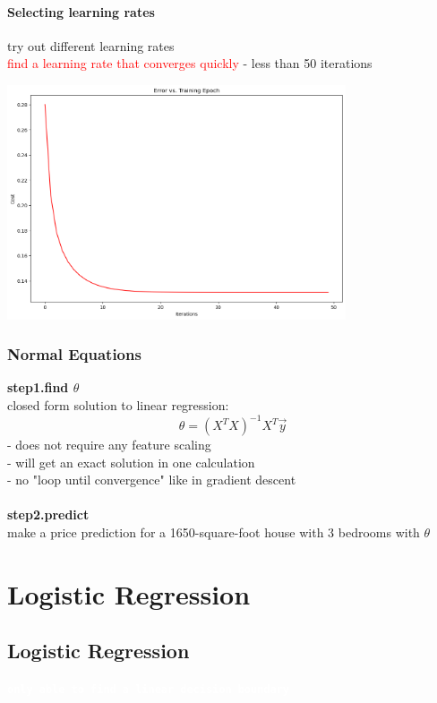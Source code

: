 \documentclass[a4paper, 12pt]{book}
\begin{document}
			\subsubsection{Selecting learning rates}
	try out different learning rates \\
	\textcolor{red}{find a learning rate that converges quickly} - less than 50 iterations
	\begin{center}
	\includegraphics[width=10cm]{epoch2} 
	\end{center}
		\subsection{Normal Equations}
	\textbf{step1.find $\theta$} \\
	closed form solution to linear regression: 
	$$\theta=(X^TX)^{-1}X^T\vec{y}$$
	{\footnotesize
		- does not require any feature scaling \\
		- will get an exact solution in one calculation \\
		- no "loop until convergence" like in gradient descent
	} \\ \\
	\textbf{step2.predict} \\
	make a price prediction for a 1650-square-foot house with 3 bedrooms with $\theta$
	
	
	
	\chapter{Logistic Regression}
	
	\section{Logistic Regression}
	
	\colorbox{deepgreen}{\textcolor{white}{\textbf{\texttt{only able to find a linear decision boundary}}}}\\
	
\end{document}
